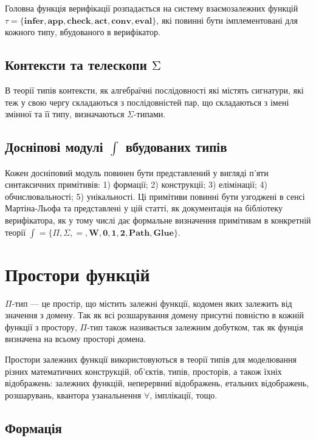 \documentclass{article}
\theoremstyle{definition}
\begin{document}
Головна функція верифікації  розпадається на систему взаємозалежних функцій
$\tau = \{ \mathbf{infer},\mathbf{app}, \mathbf{check}, \mathbf{act}, \mathbf{conv}, \mathbf{eval} \}$,
які повинні бути імплементовані для кожного типу, вбудованого в верифікатор.

\subsection*{Контексти та телескопи $\mathrm{\Sigma}$}

В теорії типів контексти, як алгебраїчні послідовності які містять сигнатури, які теж у свою
чергу складаються з послідовністей пар, що складаються з імені змінної та її типу, визначаються
$\Sigma$-типами.

\subsection*{Досніпові модулі $\mathrm{\int}$ вбудованих типів}

Кожен досніповий модуль повинен бути представлений у вигляді п'яти
синтаксичних примітивів: 1) формації; 2) конструкції; 3) елімінації;
4) обчислювальності; 5) унікальності. Ці примітиви повинні бути узгоджені
в сенсі Мартіна-Льофа та представлені у цій статті,
як документація на бібліотеку верифікатора, як у тому числі дає формальне визначення
примітивам в конкретній теорії
$\mathrm{\int} = \{ \Pi, \Sigma, =, \mathbf{W}, \mathbf{0}, \mathbf{1}, \mathbf{2}, \mathbf{Path}, \mathbf{Glue} \}$.

\newpage

\section{Простори функцій}
$\Pi$-тип — це простір, що містить залежні функції, кодомен яких залежить від значення
з домену. Так як всі розшарування домену присутні повністю в кожній функції з простору,
$\Pi$-тип також називається залежним добутком, так як фунція визначена на всьому просторі домена.

Простори залежних функції використовуються в теорії типів для моделювання різних
математичних конструкцій, об'єктів, типів, просторів, а також їхніх відображень:
залежних функцій, неперервниї відображень, етальних відображень, розшарувань, квантора
узанальнення $\forall$, імплікації, тощо.

 \subsection{Формація}
\end{document}
